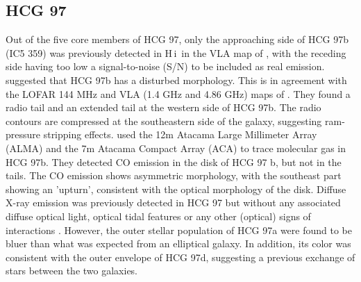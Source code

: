\documentclass{aa}
\newcommand{\HI}{H\,{\sc i}}
\begin{document}
\subsection{HCG 97}
Out of the five core members of HCG 97, only the approaching side of HCG 97b (IC5 359) was previously detected in \HI\ in the VLA map of \citet{2023A&A...670A..21J}, with the receding 
side having too low a signal-to-noise (S/N) to be included as real emission. \citet{2023A&A...670A..21J} suggested that HCG 97b has a disturbed morphology. 
This is in agreement with the LOFAR 144 MHz and VLA (1.4 GHz and 4.86 GHz) maps of \citet{2023MNRAS.tmp.3112H}. They found a radio tail and an extended tail at the western side of HCG 97b. 
The radio contours are compressed at the southeastern side of the galaxy, suggesting ram-pressure stripping effects. 
\citet{2023MNRAS.tmp.3112H} used the 12m Atacama Large Millimeter Array (ALMA) and the 7m Atacama Compact Array (ACA) to trace molecular gas in HCG 97b. 
They detected CO emission in the disk of HCG 97 b, but not in the tails. The CO emission shows asymmetric morphology, with the southeast part showing an 'upturn', 
consistent with the optical morphology of the disk. 
Diffuse X-ray emission was previously detected in HCG 97 but without any associated diffuse optical light, optical tidal features or any other (optical) signs of interactions \citep{1995AJ....110.1498P}. 
However, the outer stellar population of HCG 97a were found to be bluer than what was expected from an elliptical galaxy. In addition, its color was 
consistent with the outer envelope of HCG 97d, suggesting a previous exchange of stars between the two galaxies.          
\end{document}
